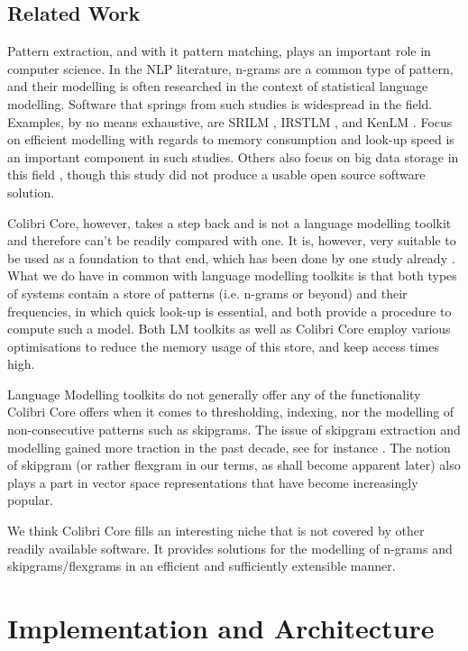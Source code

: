 \subsection*{Related Work}

Pattern extraction, and with it pattern matching, plays an important role in
computer science. In the NLP literature, n-grams are a common type of pattern,
and their modelling is often researched in the context of statistical language
modelling.  Software that springs from such studies is widespread in the field.
Examples, by no means exhaustive, are SRILM \citep{SRILM}, IRSTLM \citep{IRSTLM},
and KenLM \citep{KENLM}. Focus on efficient modelling with regards to memory
consumption and look-up speed is an important component in such studies.
Others also focus on big data storage in this field \citep{Guthrie2010}, though
this study did not produce a usable open source software solution.

Colibri Core, however, takes a step back and is not a language modelling
toolkit and therefore can't be readily compared with one. It is, however, very
suitable to be used as a foundation to that end, which has been done by
one study already \citep{COCOCPYP}. What we do have in common with language modelling toolkits is
that both types of systems contain a store of patterns (i.e. n-grams or beyond)
and their frequencies, in which quick look-up is essential, and both provide a
procedure to compute such a model. Both LM toolkits as well as Colibri Core
employ various optimisations to reduce the memory usage of this store, and keep
access times high.

Language Modelling toolkits do not generally offer any of the functionality
Colibri Core offers when it comes to thresholding, indexing, nor the modelling of
non-consecutive patterns such as skipgrams. The issue of skipgram extraction
and modelling gained more traction in the past decade, see for instance
\cite{Guthrie06}. The notion of skipgram (or rather flexgram in our terms, as
shall become apparent later) also plays a part in vector space representations
\citep{Mikolov08} that have become increasingly popular.

We think Colibri Core fills an interesting niche that is not covered by other
readily available software. It provides solutions for the modelling of n-grams and
skipgrams/flexgrams in an efficient and sufficiently extensible manner.

\section{Implementation and Architecture}

